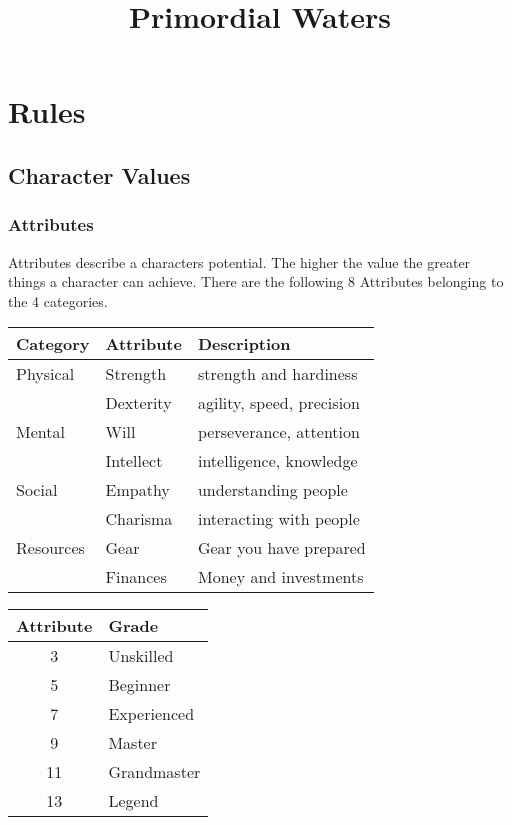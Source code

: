 \documentclass[11pt]{article}
\date{}
\title{Primordial Waters}
\begin{document}
\maketitle
{


\section{Rules}
\label{sec:org42d3a07}

\begin{multicols}{2}[]
\subsection{Character Values}
\label{sec:org20b048b}
\subsubsection{Attributes}
\label{sec:org150eabc}
Attributes describe a characters potential. The higher the value the greater things a character can achieve. There are the following 8 Attributes belonging to the 4 categories.

\begin{center}
\begin{tabular}{lll}
\textbf{Category} & \textbf{Attribute} & \textbf{Description}\\
\hline
Physical & Strength & strength and hardiness\\
 & Dexterity & agility, speed, precision\\
\hline
Mental & Will & perseverance, attention\\
 & Intellect & intelligence, knowledge\\
\hline
Social & Empathy & understanding people\\
 & Charisma & interacting with people\\
\hline
Resources & Gear & Gear you have prepared\\
 & Finances & Money and investments\\
\end{tabular}
\end{center}

\begin{center}
\begin{tabular}{c|l}
\textbf{Attribute} & \textbf{Grade}\\
\hline
3 & Unskilled\\
5 & Beginner\\
7 & Experienced\\
9 & Master\\
11 & Grandmaster\\
13 & Legend\\
\end{tabular}
\end{center}


\end{multicols}}
\end{document}
